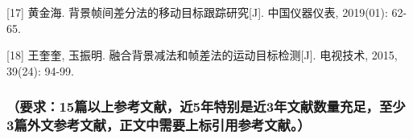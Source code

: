 \documentclass[
]{article}
\begin{document}
{[}17{]} 黄金海. 背景帧间差分法的移动目标跟踪研究{[}J{]}. 中国仪器仪表,
2019(01): 62-65.

{[}18{]} 王奎奎, 玉振明. 融合背景减法和帧差法的运动目标检测{[}J{]}.
电视技术, 2015, 39(24): 94-99.

\subsubsection{（要求：15篇以上参考文献，近5年特别是近3年文献数量充足，至少3篇外文参考文献，正文中需要上标引用参考文献。）}\label{ux8981ux6c4215ux7bc7ux4ee5ux4e0aux53c2ux8003ux6587ux732eux8fd15ux5e74ux7279ux522bux662fux8fd13ux5e74ux6587ux732eux6570ux91cfux5145ux8db3ux81f3ux5c113ux7bc7ux5916ux6587ux53c2ux8003ux6587ux732eux6b63ux6587ux4e2dux9700ux8981ux4e0aux6807ux5f15ux7528ux53c2ux8003ux6587ux732e}
\end{document}
